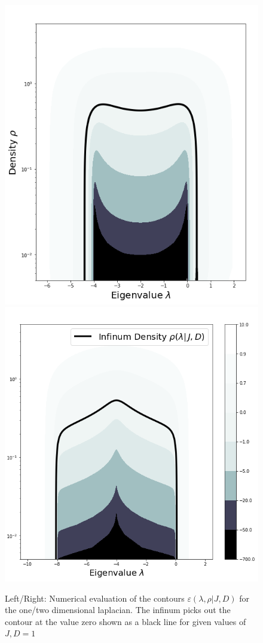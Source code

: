 \documentclass{article}[12pt]
\numberwithin{equation}{section}
\begin{document}
\begin{figure}[H]
\centering{}
\captionsetup{justification=centering}
\includegraphics[scale=0.3]{figures/1dinf}
\includegraphics[scale=0.3]{figures/2dinf}
\caption{Left/Right: Numerical evaluation of the contours
$\varepsilon(\lambda,\rho|J,D)$ for the one/two dimensional laplacian. The
infinum picks out the contour at the value zero shown as a black line
for given values of $J,D=1$}
\label{fig:inf}
\end{figure}
\end{document}
